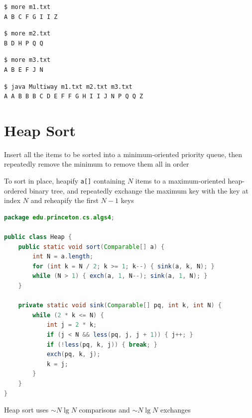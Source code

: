 \documentclass[8pt,a4paper,compress]{beamer}
\begin{document}
\begin{frame}[fragile]
\pause

\begin{lstlisting}[language={}]
$ more m1.txt 
A B C F G I I Z
\end{lstlisting}

\pause

\begin{lstlisting}[language={}]
$ more m2.txt 
B D H P Q Q
\end{lstlisting}

\pause

\begin{lstlisting}[language={}]
$ more m3.txt 
A B E F J N
\end{lstlisting}

\pause

\begin{lstlisting}[language={}]
$ java Multiway m1.txt m2.txt m3.txt 
A A B B B C D E F F G H I I J N P Q Q Z 
\end{lstlisting}
\end{frame}

\section{Heap Sort}
\begin{frame}[fragile]
\pause

Insert all the items to be sorted into a minimum-oriented priority queue, then repeatedly remove the minimum to remove them all in order

\pause
\bigskip

To sort in place, heapify \lstinline$a[]$ containing $N$ items to a maximum-oriented heap-ordered binary tree, and repeatedly exchange the maximum key with the key at index $N$ and reheapify the first $N - 1$ keys 

\pause

\begin{lstlisting}[language=Java]
package edu.princeton.cs.algs4;

public class Heap {
    public static void sort(Comparable[] a) {
        int N = a.length;
        for (int k = N / 2; k >= 1; k--) { sink(a, k, N); }
        while (N > 1) { exch(a, 1, N--); sink(a, 1, N); }
    }
    
    private static void sink(Comparable[] pq, int k, int N) {
        while (2 * k <= N) {
            int j = 2 * k;
            if (j < N && less(pq, j, j + 1)) { j++; }
            if (!less(pq, k, j)) { break; }
            exch(pq, k, j);
            k = j;
        }
    }
}
\end{lstlisting}

\pause
\bigskip

Heap sort uses $\sim N \lg N$ comparisons and $\sim N \lg N$ exchanges
\end{frame}
\end{document}
